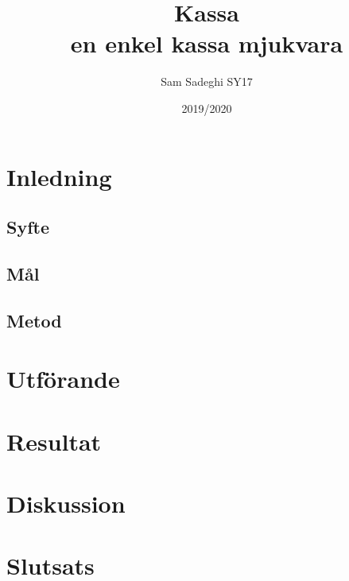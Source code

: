 \documentclass[a4paper, 12pt]{article}
\title{Kassa\\\large en enkel kassa mjukvara}
\author{Sam Sadeghi SY17}
\date{2019/2020}
\begin{document}
\begin{titlepage}
\maketitle
\end{titlepage}
\begin{abstract}

\end{abstract}
\newpage
\tableofcontents
\newpage

\section{Inledning}

\subsection{Syfte}

\subsection{Mål}

\subsection{Metod}

\section{Utförande}

\section{Resultat}

\section{Diskussion}

\section{Slutsats}

\newpage 

\printbibliography
\end{document}
